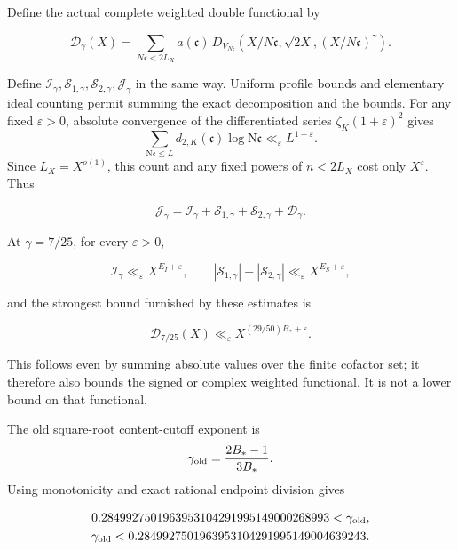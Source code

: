 \documentclass[11pt]{article}
\newcommand{\mathscr}{\mathcal}
\numberwithin{equation}{section}
\newcommand{\N}{\mathrm N}
\begin{document}
Define the actual complete weighted double functional by

\begin{equation}\label{res:D4}
\mathscr D_\gamma(X)
 =\sum_{N\mathfrak c<2L_X}a(\mathfrak c)\,
 D_{V_{N\mathfrak c}}
 \left(X/N\mathfrak c,\sqrt{2X},(X/N\mathfrak c)^\gamma\right).
\end{equation}

Define \(\mathscr I_\gamma,\mathscr S_{1,\gamma},
\mathscr S_{2,\gamma},\mathscr J_\gamma\) in the same way. Uniform
profile bounds and elementary ideal counting permit summing the exact
decomposition and the bounds. For any fixed \(\varepsilon>0\), absolute
convergence of the differentiated series \(\zeta_K(1+\varepsilon)^2\)
gives \[
 \sum_{\N\mathfrak c\leq L}
 d_{2,K}(\mathfrak c)\log\N\mathfrak c
 \ll_\varepsilon L^{1+\varepsilon}.
\] Since \(L_X=X^{o(1)}\), this count and any fixed powers of \(n<2L_X\)
cost only \(X^\varepsilon\). Thus

\begin{equation}\label{res:D5}
\mathscr J_\gamma
 =\mathscr I_\gamma+\mathscr S_{1,\gamma}
  +\mathscr S_{2,\gamma}+\mathscr D_\gamma.
\end{equation}

At \(\gamma=7/25\), for every \(\varepsilon>0\),

\begin{equation}\label{res:D6}
\mathscr I_\gamma\ll_\varepsilon X^{E_I+\varepsilon},
 \qquad
 |\mathscr S_{1,\gamma}|+|\mathscr S_{2,\gamma}|
 \ll_\varepsilon X^{E_S+\varepsilon},
\end{equation}

and the strongest bound furnished by these estimates is

\begin{equation}\label{res:D7}
\boxed{\quad
 \mathscr D_{7/25}(X)
 \ll_\varepsilon X^{(29/50)B_*+\varepsilon}.
 \quad}
\end{equation}

This follows even by summing absolute values over the finite cofactor
set; it therefore also bounds the signed or complex weighted functional.
It is not a lower bound on that functional.

The old square-root content-cutoff exponent is \[
 \gamma_{\rm old}=\frac{2B_*-1}{3B_*}.
\] Using monotonicity and exact rational endpoint division gives

\begin{equation}\label{res:D8}
\begin{gathered}
0.2849927501963953104291995149000268993<\gamma_{\rm old},\\
 \gamma_{\rm old}<0.2849927501963953104291995149004639243.
\end{gathered}
\end{equation}
\end{document}
